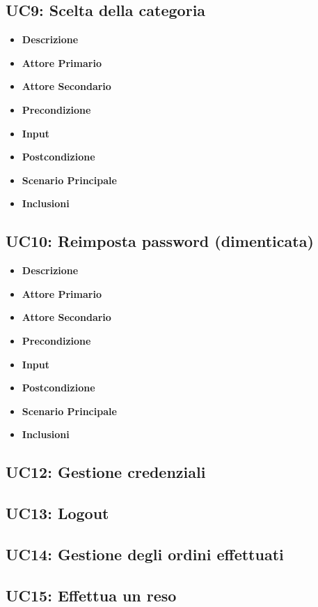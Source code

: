         \subsection{UC9: Scelta della categoria}
        \begin{itemize}
            \item \textbf{Descrizione}
            \item \textbf{Attore Primario}
            \item \textbf{Attore Secondario}
            \item \textbf{Precondizione}
            \item \textbf{Input}
            \item \textbf{Postcondizione}
            \item \textbf{Scenario Principale}
            \item \textbf{Inclusioni}
        \end{itemize}
        \subsection{UC10: Reimposta password (dimenticata)}
        \begin{itemize}
            \item \textbf{Descrizione}
            \item \textbf{Attore Primario}
            \item \textbf{Attore Secondario}
            \item \textbf{Precondizione}
            \item \textbf{Input}
            \item \textbf{Postcondizione}
            \item \textbf{Scenario Principale}
            \item \textbf{Inclusioni}
        \end{itemize}
        \subsection{UC12: Gestione credenziali}
        \subsection{UC13: Logout}
        \subsection{UC14: Gestione degli ordini effettuati}
        \subsection{UC15: Effettua un reso}
